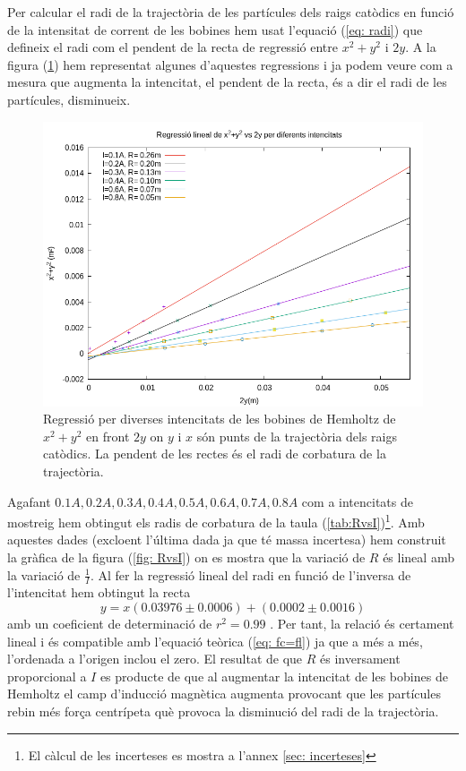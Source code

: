 \documentclass[11pt]{article}
\begin{document}
Per calcular el radi de la trajectòria de les partícules dels raigs catòdics en funció de la intensitat de corrent de les bobines hem usat l'equació (\ref{eq: radi}) que defineix el radi com el pendent de la recta de regressió entre $x^2+y^2$ i $2y$. A la figura (\ref{fig: regressio_1}) hem representat algunes d'aquestes regressions i ja podem veure com a mesura que augmenta la intencitat, el pendent de la recta, és a dir el radi de les partícules, disminueix. 
\begin{figure}[H]
    \centering
    \includegraphics[scale=0.3]{regressio_1.png}
    \caption{Regressió per diverses intencitats de les bobines de Hemholtz de $x^2+y^2$ en front $2y$ on $y$ i $x$ són punts de la trajectòria dels raigs catòdics. La pendent de les rectes és el radi de corbatura de la trajectòria.}
    \label{fig: regressio_1}
\end{figure}

Agafant $0.1A, 0.2A, 0.3A, 0.4A, 0.5A, 0.6A, 0.7A, 0.8A$ com a intencitats de mostreig hem obtingut els radis de corbatura de la taula (\ref{tab:RvsI})\footnote{El càlcul de les incerteses es mostra a l'annex \ref{sec: incerteses}}. Amb aquestes dades (excloent l'última dada ja que té massa incertesa) hem construit la gràfica de la figura (\ref{fig: RvsI}) on es mostra que la variació de $R$ és lineal amb la variació de $\frac{1}{I}$. 
Al fer la regressió lineal del radi en funció de l'inversa de l'intencitat hem obtingut la recta
\begin{equation}
    y=x(0.03976\pm0.0006)+(0.0002\pm0.0016)
\end{equation}  
amb un coeficient de determinació de $r^2=0.99$ . Per tant, la relació és certament lineal i és compatible amb l'equació teòrica (\ref{eq: fc=fl}) ja que a més a més, l'ordenada a l'origen inclou el zero. El resultat de que $R$ és inversament proporcional a $I$ es producte de que al augmentar la intencitat de les bobines de Hemholtz el camp d'inducció magnètica augmenta provocant que les partícules rebin més força centrípeta què provoca la disminució del radi de la trajectòria.
\end{document}
